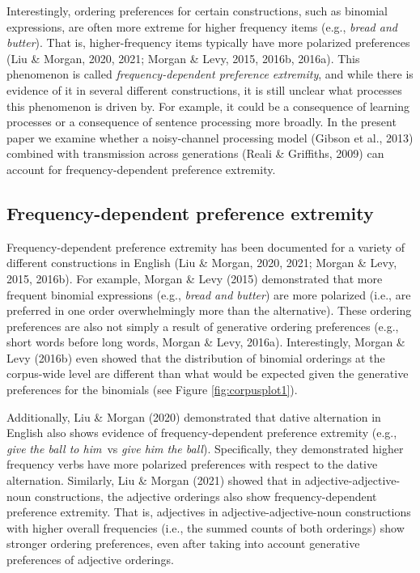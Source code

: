 \documentclass[10pt, letterpaper]{article}
\begin{document}
Interestingly, ordering preferences for certain constructions, such as
binomial expressions, are often more extreme for higher frequency items
(e.g., \emph{bread and butter}). That is, higher-frequency items
typically have more polarized preferences (Liu \& Morgan, 2020, 2021;
Morgan \& Levy, 2015, 2016b, 2016a). This phenomenon is called
\emph{frequency-dependent preference extremity}, and while there is
evidence of it in several different constructions, it is still unclear
what processes this phenomenon is driven by. For example, it could be a
consequence of learning processes or a consequence of sentence
processing more broadly. In the present paper we examine whether a
noisy-channel processing model (Gibson et al., 2013) combined with
transmission across generations (Reali \& Griffiths, 2009) can account
for frequency-dependent preference extremity.

\hypertarget{frequency-dependent-preference-extremity}{%
\subsection{Frequency-dependent preference
extremity}\label{frequency-dependent-preference-extremity}}

Frequency-dependent preference extremity has been documented for a
variety of different constructions in English (Liu \& Morgan, 2020,
2021; Morgan \& Levy, 2015, 2016b). For example, Morgan \& Levy (2015)
demonstrated that more frequent binomial expressions (e.g., \emph{bread
and butter}) are more polarized (i.e., are preferred in one order
overwhelmingly more than the alternative). These ordering preferences
are also not simply a result of generative ordering preferences (e.g.,
short words before long words, Morgan \& Levy, 2016a). Interestingly,
Morgan \& Levy (2016b) even showed that the distribution of binomial
orderings at the corpus-wide level are different than what would be
expected given the generative preferences for the binomials (see Figure
\ref{fig:corpusplot1}).

Additionally, Liu \& Morgan (2020) demonstrated that dative alternation
in English also shows evidence of frequency-dependent preference
extremity (e.g., \emph{give} \emph{the ball to him}~vs \emph{give him
the ball}). Specifically, they demonstrated higher frequency verbs have
more polarized preferences with respect to the dative alternation.
Similarly, Liu \& Morgan (2021) showed that in adjective-adjective-noun
constructions, the adjective orderings also show frequency-dependent
preference extremity. That is, adjectives in adjective-adjective-noun
constructions with higher overall frequencies (i.e., the summed counts
of both orderings) show stronger ordering preferences, even after taking
into account generative preferences of adjective orderings.
\end{document}
